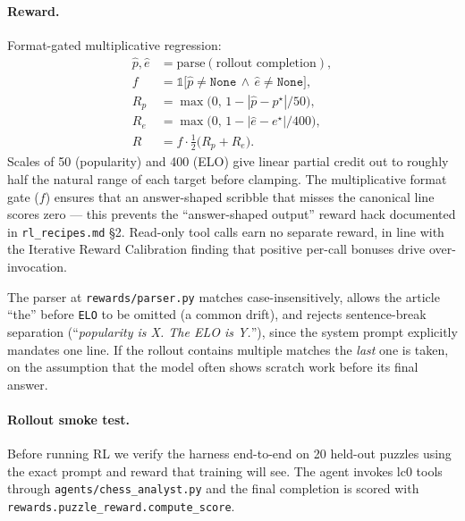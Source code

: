 \paragraph{Reward.}
Format-gated multiplicative regression:
\begin{align*}
\hat p, \hat e &= \mathrm{parse}(\text{rollout completion}),\\
f               &= \mathbb{1}\bigl[\hat p \neq \texttt{None} \,\wedge\, \hat e \neq \texttt{None}\bigr],\\
R_p             &= \max\!\bigl(0,\, 1 - |\hat p - p^\star| / 50\bigr),\\
R_e             &= \max\!\bigl(0,\, 1 - |\hat e - e^\star| / 400\bigr),\\
R               &= f \cdot \tfrac{1}{2}\bigl(R_p + R_e\bigr).
\end{align*}
Scales of 50 (popularity) and 400 (ELO) give linear partial credit out
to roughly half the natural range of each target before clamping. The
multiplicative format gate ($f$) ensures that an answer-shaped scribble
that misses the canonical line scores zero --- this prevents the
``answer-shaped output'' reward hack documented in \texttt{rl\_recipes.md}
\S2. Read-only tool calls earn no separate reward, in line with the
Iterative Reward Calibration finding that positive per-call bonuses
drive over-invocation.

The parser at \texttt{rewards/parser.py} matches case-insensitively, allows
the article ``the'' before \texttt{ELO} to be omitted (a common drift),
and rejects sentence-break separation (``\textsl{popularity is X. The ELO
is Y.}''), since the system prompt explicitly mandates one line. If the
rollout contains multiple matches the \emph{last} one is taken, on the
assumption that the model often shows scratch work before its final
answer.

\paragraph{Rollout smoke test.}
Before running RL we verify the harness end-to-end on 20 held-out
puzzles using the exact prompt and reward that training will see. The
agent invokes lc0 tools through \texttt{agents/chess\_analyst.py} and the
final completion is scored with \texttt{rewards.puzzle\_reward.compute\_score}.

